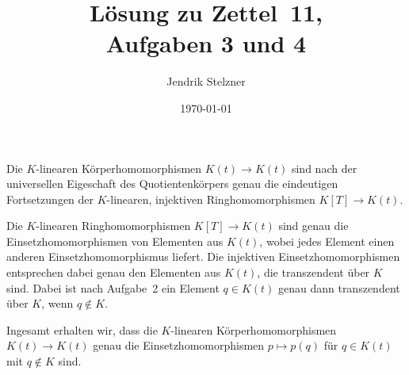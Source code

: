 \documentclass[a4paper,10pt,numbers=noenddot]{scrartcl}
\title{Lösung zu Zettel~11, \\ Aufgaben 3 und 4}
\author{Jendrik Stelzner}
\date{\today}
\begin{document}
\maketitle





\addtocounter{section}{2}





\section{}

Die $K$-linearen Körperhomomorphismen $K(t) \to K(t)$ sind nach der universellen Eigeschaft des Quotientenkörpers genau die eindeutigen Fortsetzungen der $K$-linearen, injektiven Ringhomomorphismen $K[T] \to K(t)$.

Die $K$-linearen Ringhomomorphismen $K[T] \to K(t)$ sind genau die Einsetzhomomorphismen von Elementen aus $K(t)$, wobei jedes Element einen anderen Einsetzhomomorphismus liefert.
Die injektiven Einsetzhomomorphismen entsprechen dabei genau den Elementen aus $K(t)$, die transzendent über $K$ sind.
Dabei ist nach Aufgabe~2 ein Element $q \in K(t)$ genau dann transzendent über $K$, wenn $q \notin K$.

Ingesamt erhalten wir, dass die $K$-linearen Körperhomomorphismen $K(t) \to K(t)$ genau die Einsetzhomomorphismen $p \mapsto p(q)$ für $q \in K(t)$ mit $q \notin K$ sind.
\end{document}
